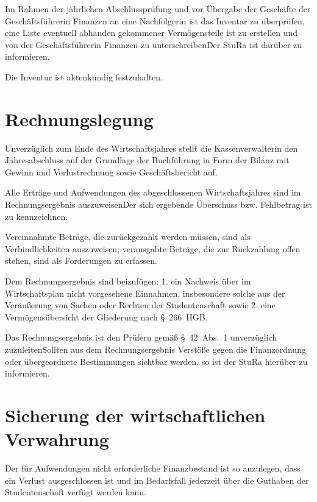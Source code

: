 \Abs \Satz Im Rahmen der jährlichen Abschlussprüfung und vor Übergabe der Geschäfte der Geschäftsführerin Finanzen an eine Nachfolgerin ist das Inventar zu überprüfen, eine Liste eventuell abhanden gekommener Vermögensteile ist zu erstellen und von der Geschäftsführerin Finanzen zu unterschreiben\. Der StuRa ist darüber zu informieren.

\Abs \Satz Die Inventur ist aktenkundig festzuhalten.



\section{Rechnungslegung}

\Abs \Satz Unverzüglich zum Ende des Wirtschaftsjahres stellt die Kassenverwalterin den Jahresabschluss auf der Grundlage der Buchführung in Form der Bilanz mit Gewinn und Verlustrechnung sowie Geschäftsbericht auf.

\Abs \Satz Alle Erträge und Aufwendungen des abgeschlossenen Wirtschaftsjahres sind im Rechnungsergebnis auszuweisen\. Der sich ergebende Überschuss bzw. Fehlbetrag ist zu kennzeichnen.

\Abs \Satz Vereinnahmte Beträge, die zurückgezahlt werden müssen, sind als Verbindlichkeiten auszuweisen; verausgabte Beträge, die zur Rückzahlung offen stehen, sind als Forderungen zu erfassen.

\Abs \Satz Dem Rechnungsergebnis sind beizufügen:
1. ein Nachweis über im Wirtschaftsplan nicht vorgesehene Einnahmen, insbesondere solche aus der Veräußerung von Sachen oder Rechten der Studentenschaft sowie
2. eine Vermögensübersicht der Gliederung nach §~266~HGB.

\Abs \Satz Das Rechnungsergebnis ist den Prüfern gemäß §~42~Abs.~1 unverzüglich zuzuleiten\. Sollten aus dem Rechnungsergebnis Verstöße gegen die Finanzordnung oder übergeordnete Bestimmungen sichtbar werden, so ist der StuRa hierüber zu informieren.



\section{Sicherung der wirtschaftlichen Verwahrung}

\Abs \Satz Der für Aufwendungen nicht erforderliche Finanzbestand ist so anzulegen, dass ein Verlust ausgeschlossen ist und im Bedarfsfall jederzeit über die Guthaben der Studentenschaft verfügt werden kann.

